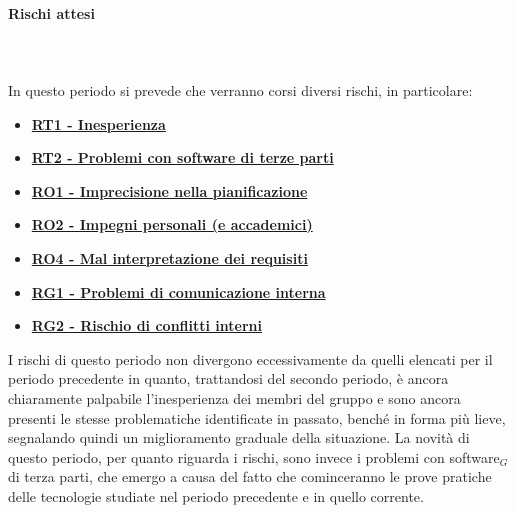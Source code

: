 \paragraph{Rischi attesi} \hspace{1cm}
\\ \hspace{1cm} \\
In questo periodo si prevede che verranno corsi diversi rischi, in particolare:
\begin{itemize}
    \item \textbf{\hyperlink{RT1}{RT1 - Inesperienza}}
    \item \textbf{\hyperlink{RT2}{RT2 - Problemi con software di terze parti}}
    \item \textbf{\hyperlink{RO1}{RO1 - Imprecisione nella pianificazione}}
    \item \textbf{\hyperlink{RO2}{RO2 - Impegni personali (e accademici)}}
    \item \textbf{\hyperlink{RO4}{RO4 - Mal interpretazione dei requisiti}}
    \item \textbf{\hyperlink{RG1}{RG1 - Problemi di comunicazione interna}}
    \item \textbf{\hyperlink{RG2}{RG2 - Rischio di conflitti interni}}
\end{itemize}
I rischi di questo periodo non divergono eccessivamente da quelli elencati per il periodo precedente in quanto, trattandosi del secondo periodo, è ancora chiaramente palpabile l'inesperienza dei membri del gruppo e sono ancora presenti le stesse problematiche identificate in passato, benché in forma più lieve, segnalando quindi un miglioramento graduale della situazione. 
La novità di questo periodo, per quanto riguarda i rischi, sono invece i problemi con software$_G$ di terza parti, che emergo a causa del fatto che cominceranno le prove pratiche delle tecnologie studiate nel periodo precedente e in quello corrente.
